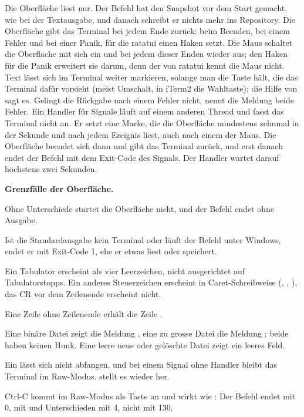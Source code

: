 Die Oberfläche liest nur. Der Befehl hat den Snapshot vor dem Start gemacht, wie bei der
Textausgabe, und danach schreibt er nichts mehr ins Repository. Die Oberfläche gibt das Terminal
bei jedem Ende zurück: beim Beenden, bei einem Fehler und bei einer Panik, für die ratatui einen
Haken setzt. Die Maus schaltet die Oberfläche mit sich ein und bei jedem dieser Enden wieder aus;
den Haken für die Panik erweitert sie darum, denn der von ratatui kennt die Maus nicht.
Text lässt sich im Terminal weiter markieren, solange man die Taste hält, die das Terminal dafür
vorsieht (meist Umschalt, in iTerm2 die Wahltaste); die Hilfe von  sagt es.
Gelingt die Rückgabe nach einem Fehler nicht, nennt die Meldung beide Fehler.
Ein Handler für Signale läuft auf einem anderen Thread und fasst das Terminal nicht an. Er setzt
eine Marke, die die Oberfläche mindestens zehnmal in der Sekunde und nach jedem Ereignis liest,
auch nach einem der Maus. Die
Oberfläche beendet sich dann und gibt das Terminal zurück, und erst danach endet der Befehl mit
dem Exit-Code des Signals. Der Handler wartet darauf höchstens zwei Sekunden.

\startinfobox
{\bf Grenzfälle der Oberfläche.}
\startitemize
\item Ohne Unterschiede startet die Oberfläche nicht, und der Befehl endet ohne Ausgabe.
\item Ist die Standardausgabe kein Terminal oder läuft der Befehl unter Windows, endet er mit
Exit-Code 1, ehe er etwas liest oder speichert.
\item Ein Tabulator erscheint als vier Leerzeichen, nicht ausgerichtet auf Tabulatorstopps.
Ein anderes Steuerzeichen erscheint in Caret-Schreibweise (\type{^[}, , ),
das CR vor dem Zeilenende erscheint nicht.
\item Eine Zeile ohne Zeilenende erhält die Zeile .
\item Eine binäre Datei zeigt die Meldung , eine zu grosse Datei die
Meldung ; beide haben keinen Hunk.
Eine leere neue oder gelöschte Datei zeigt ein leeres Feld.
\item Ein  lässt sich nicht abfangen, und bei einem Signal ohne Handler bleibt das
Terminal im Raw-Modus.  stellt es wieder her.
\item Ctrl-C kommt im Raw-Modus als Taste an und wirkt wie : Der Befehl endet mit 0, mit
 und Unterschieden mit 4, nicht mit 130.
\stopitemize
\stopinfobox

